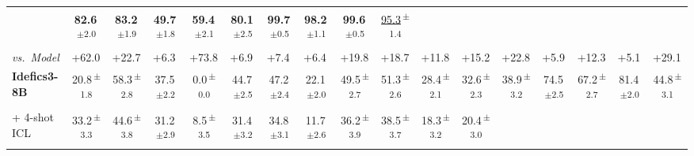 \documentclass[sigconf,review,anonymous,9pt,table]{acmart}
\begin{document}
\begin{table}[t]
{\begin{tabular}{@{}l
  c c
  c c c c c
  c c c c
  c c c c c
  @{}}
  & \cellcolor{myblue!8}\textbf{82.6}\textsuperscript{\,$\pm$2.0} & \cellcolor{myblue!8}\textbf{83.2}\textsuperscript{\,$\pm$1.9} & \cellcolor{myblue!8}\textbf{49.7}\textsuperscript{\,$\pm$1.8} & \cellcolor{myblue!8}\textbf{59.4}\textsuperscript{\,$\pm$2.1}
  & \cellcolor{myblue!8}\textbf{80.1}\textsuperscript{\,$\pm$2.5} & \cellcolor{myblue!8}\textbf{99.7}\textsuperscript{\,$\pm$0.5} & \cellcolor{myblue!8}\textbf{98.2}\textsuperscript{\,$\pm$1.1} & \cellcolor{myblue!8}\textbf{99.6}\textsuperscript{\,$\pm$0.5} & \cellcolor{myblue!8}\underline{95.3}\textsuperscript{\,$\pm$1.4} \\
\textcolor{mygreen}{\textit{vs.~Model}}
  & \multicolumn{1}{l}{\textcolor{mygreen}{+62.0}} & \multicolumn{1}{l}{\textcolor{mygreen}{+22.7}} & \multicolumn{1}{l}{\textcolor{mygreen}{+6.3}} & \multicolumn{1}{l}{\textcolor{mygreen}{+73.8}} & \multicolumn{1}{l}{\textcolor{mygreen}{+6.9}} & \multicolumn{1}{l}{\textcolor{mygreen}{+7.4}} & \multicolumn{1}{l}{\textcolor{mygreen}{+6.4}}
  & \multicolumn{1}{l}{\textcolor{mygreen}{+19.8}} & \multicolumn{1}{l}{\textcolor{mygreen}{+18.7}} & \multicolumn{1}{l}{\textcolor{mygreen}{+11.8}} & \multicolumn{1}{l}{\textcolor{mygreen}{+15.2}}
  & \multicolumn{1}{l}{\textcolor{mygreen}{+22.8}} & \multicolumn{1}{l}{\textcolor{mygreen}{+5.9}} & \multicolumn{1}{l}{\textcolor{mygreen}{+12.3}} & \multicolumn{1}{l}{\textcolor{mygreen}{+5.1}} & \multicolumn{1}{l}{\textcolor{mygreen}{+29.1}} \\
\midrule
\textbf{Idefics3-8B}
  & 20.8\textsuperscript{\,$\pm$1.8} & 58.3\textsuperscript{\,$\pm$2.8} & 37.5\textsuperscript{\,$\pm$2.2} & 0.0\textsuperscript{\,$\pm$0.0} & 44.7\textsuperscript{\,$\pm$2.5} & 47.2\textsuperscript{\,$\pm$2.4} & 22.1\textsuperscript{\,$\pm$2.0}
  & 49.5\textsuperscript{\,$\pm$2.7} & 51.3\textsuperscript{\,$\pm$2.6} & 28.4\textsuperscript{\,$\pm$2.1} & 32.6\textsuperscript{\,$\pm$2.3}
  & 38.9\textsuperscript{\,$\pm$3.2} & 74.5\textsuperscript{\,$\pm$2.5} & 67.2\textsuperscript{\,$\pm$2.7} & 81.4\textsuperscript{\,$\pm$2.0} & 44.8\textsuperscript{\,$\pm$3.1} \\
+ 4-shot ICL
  & 33.2\textsuperscript{\,$\pm$3.3} & 44.6\textsuperscript{\,$\pm$3.8} & 31.2\textsuperscript{\,$\pm$2.9} & 8.5\textsuperscript{\,$\pm$3.5} & 31.4\textsuperscript{\,$\pm$3.2} & 34.8\textsuperscript{\,$\pm$3.1} & 11.7\textsuperscript{\,$\pm$2.6}
  & 36.2\textsuperscript{\,$\pm$3.9} & 38.5\textsuperscript{\,$\pm$3.7} & 18.3\textsuperscript{\,$\pm$3.2} & 20.4\textsuperscript{\,$\pm$3.0}

\end{tabular}}
\end{table}
\end{document}
